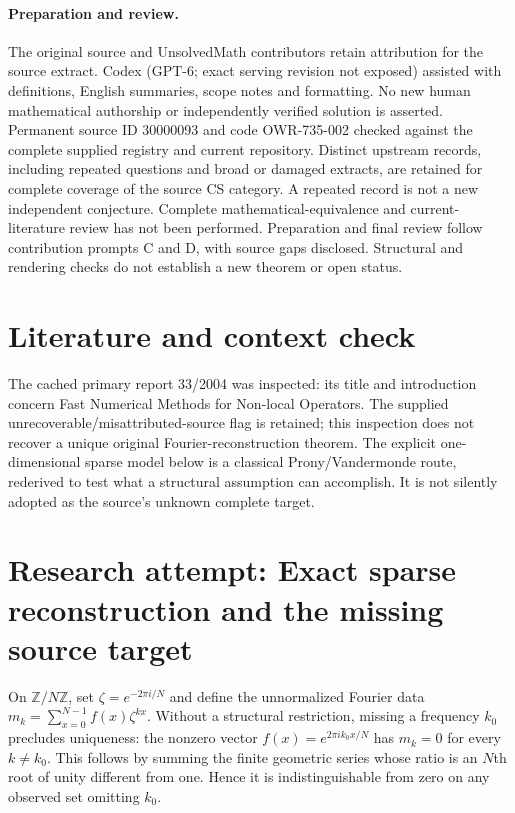 \documentclass[11pt]{article}
\begin{document}
\paragraph{Preparation and review.}
The original source and UnsolvedMath contributors retain attribution for the source extract. Codex (GPT-6; exact serving revision not exposed) assisted with definitions, English summaries, scope notes and formatting. No new human mathematical authorship or independently verified solution is asserted. Permanent source ID 30000093 and code OWR-735-002 checked against the complete supplied registry and current repository. Distinct upstream records, including repeated questions and broad or damaged extracts, are retained for complete coverage of the source CS category. A repeated record is not a new independent conjecture. Complete mathematical-equivalence and current-literature review has not been performed. Preparation and final review follow contribution prompts C and D, with source gaps disclosed. Structural and rendering checks do not establish a new theorem or open status.
\label{end:30000093}

\section{Literature and context check}
The cached primary report 33/2004 was inspected: its title and introduction concern Fast Numerical Methods for Non-local Operators. The supplied unrecoverable/misattributed-source flag is retained; this inspection does not recover a unique original Fourier-reconstruction theorem. The explicit one-dimensional sparse model below is a classical Prony/Vandermonde route, rederived to test what a structural assumption can accomplish. It is not silently adopted as the source's unknown complete target.
\section{Research attempt: Exact sparse reconstruction and the missing source target}
On $\mathbb Z/N\mathbb Z$, set $\zeta=e^{-2\pi i/N}$ and define the unnormalized Fourier data $m_k=\sum_{x=0}^{N-1}f(x)\zeta^{kx}$. Without a structural restriction, missing a frequency $k_0$ precludes uniqueness: the nonzero vector $f(x)=e^{2\pi i k_0x/N}$ has $m_k=0$ for every $k\ne k_0$. This follows by summing the finite geometric series whose ratio is an $N$th root of unity different from one. Hence it is indistinguishable from zero on any observed set omitting $k_0$.
\end{document}
